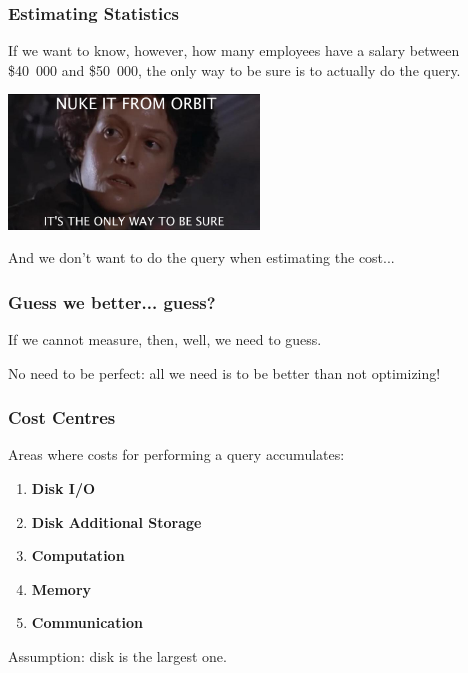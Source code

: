 \begin{frame}
\frametitle{Estimating Statistics}

If we want to know, however, how many employees have a salary between \$40~000 and \$50~000, the only way to be sure is to actually do the query.

\begin{center}
	\includegraphics[width=0.5\textwidth]{images/nuke-from-orbit.jpg}
\end{center}

And we don't want to do the query when estimating the cost...

\end{frame}


\begin{frame}
\frametitle{Guess we better... guess?}

If we cannot measure, then, well, we need to guess.

No need to be perfect: all we need is to be better than not optimizing!

\end{frame}

\begin{frame}
\frametitle{Cost Centres}

Areas where costs for performing a query accumulates:

\begin{enumerate}
	\item \textbf{Disk I/O}
	\item \textbf{Disk Additional Storage}
	\item \textbf{Computation}
	\item \textbf{Memory}
	\item \textbf{Communication}
\end{enumerate}

Assumption: disk is the largest one.

\end{frame}


